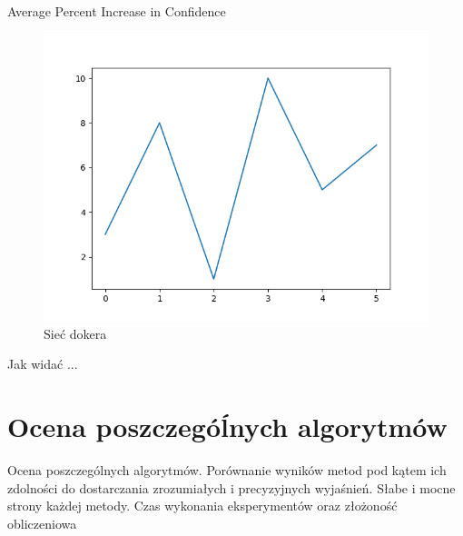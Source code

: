 Average Percent Increase in Confidence
\begin{figure}
  \centering\includegraphics[width=.6\textwidth]{images/example}
\caption{Sieć dokera \cite{docker_compose_reference}}  \label{rys:network}
\end{figure}

Jak widać ...

\section*{Ocena poszczegóĺnych algorytmów}
Ocena poszczególnych algorytmów.
Porównanie wyników metod pod kątem ich zdolności do dostarczania zrozumiałych i precyzyjnych wyjaśnień.
Słabe i mocne strony każdej metody.
Czas wykonania eksperymentów oraz złożoność obliczeniowa

